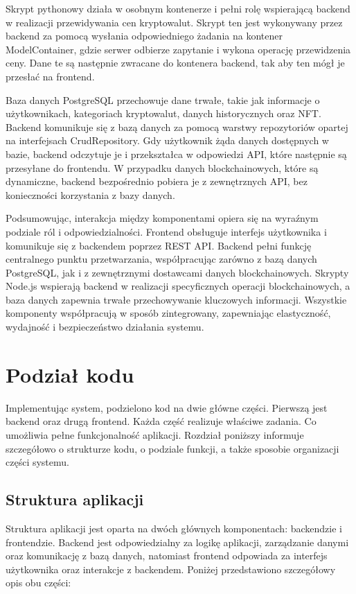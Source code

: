 Skrypt pythonowy działa w osobnym kontenerze i pełni rolę wspierającą backend w realizacji przewidywania cen kryptowalut. Skrypt ten jest wykonywany przez backend za pomocą wysłania odpowiedniego żadania na kontener ModelContainer, gdzie serwer odbierze zapytanie i wykona operację przewidzenia ceny. Dane te są następnie zwracane do kontenera backend, tak aby ten mógł je przesłać na frontend.

Baza danych PostgreSQL przechowuje dane trwałe, takie jak informacje o użytkownikach, kategoriach kryptowalut, danych historycznych oraz NFT. Backend komunikuje się z bazą danych za pomocą warstwy repozytoriów opartej na interfejsach CrudRepository. Gdy użytkownik żąda danych dostępnych w bazie, backend odczytuje je i przekształca w odpowiedzi API, które następnie są przesyłane do frontendu. W przypadku danych blockchainowych, które są dynamiczne, backend bezpośrednio pobiera je z zewnętrznych API, bez konieczności korzystania z bazy danych.

Podsumowując, interakcja między komponentami opiera się na wyraźnym podziale ról i odpowiedzialności. Frontend obsługuje interfejs użytkownika i komunikuje się z backendem poprzez REST API. Backend pełni funkcję centralnego punktu przetwarzania, współpracując zarówno z bazą danych PostgreSQL, jak i z zewnętrznymi dostawcami danych blockchainowych. Skrypty Node.js wspierają backend w realizacji specyficznych operacji blockchainowych, a baza danych zapewnia trwałe przechowywanie kluczowych informacji. Wszystkie komponenty współpracują w sposób zintegrowany, zapewniając elastyczność, wydajność i bezpieczeństwo działania systemu.

\section{Podział kodu}

Implementując system, podzielono kod na dwie główne części. Pierwszą jest backend oraz drugą frontend. Każda część realizuje właściwe zadania. Co umożliwia pełne  funkcjonalność aplikacji. Rozdział poniższy informuje szczegółowo o strukturze kodu, o podziale funkcji, a także sposobie organizacji części systemu.

\subsection{Struktura aplikacji}

Struktura aplikacji jest oparta na dwóch głównych komponentach: backendzie i frontendzie. Backend jest odpowiedzialny za logikę aplikacji, zarządzanie danymi oraz komunikację z bazą danych, natomiast frontend odpowiada za interfejs użytkownika oraz interakcje z backendem. Poniżej przedstawiono szczegółowy opis obu części:

